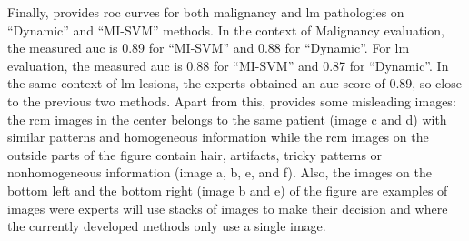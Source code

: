 \documentclass[journal,article,accept,moreauthors,pdftex, applsci]{Definitions/mdpi}
\begin{document}
Finally,  provides \ac{roc} curves for both malignancy and \ac{lm} pathologies on “Dynamic” and “MI-SVM” methods. In the context of Malignancy evaluation, the measured \ac{auc} is 0.89 for “MI-SVM” and 0.88 for “Dynamic”. For \ac{lm} evaluation, the measured \ac{auc} is 0.88 for “MI-SVM” and 0.87 for “Dynamic”. In the same context of \ac{lm} lesions, the experts obtained an \ac{auc} score of 0.89, so close to the previous two methods. Apart from this,  provides some misleading images: the \ac{rcm} images in the center belongs to the same patient (image c and d) with similar patterns and homogeneous information while the \ac{rcm} images on the outside parts of the figure contain hair, artifacts, tricky patterns or nonhomogeneous information (image a, b, e, and f). Also, the images on the bottom left and the bottom right (image b and e) of the figure are examples of images were experts will use stacks of images to make their decision and where the currently developed methods only use a single image.
\end{document}
